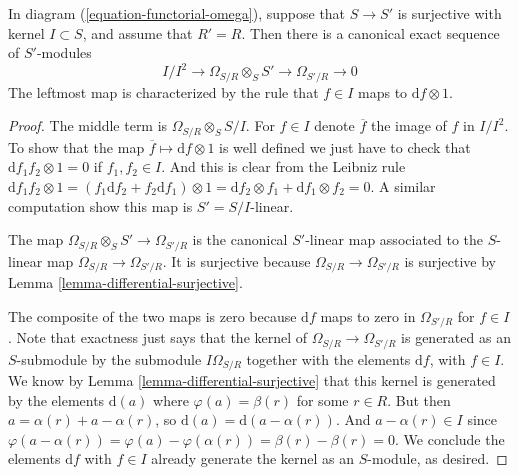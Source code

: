 \begin{lemma}
\label{lemma-differential-seq}
In diagram (\ref{equation-functorial-omega}),
suppose that $S \to S'$ is surjective with kernel $I \subset S$,
and assume that $R' = R$.
Then there is a canonical exact sequence of $S'$-modules
$$
I/I^2
\longrightarrow
\Omega_{S/R} \otimes_S S'
\longrightarrow
\Omega_{S'/R}
\longrightarrow
0
$$
The leftmost map is characterized by the rule that
$f \in I$ maps to $\text{d}f \otimes 1$.
\end{lemma}

\begin{proof}
The middle term is $\Omega_{S/R} \otimes_S S/I$.
For $f \in I$ denote $\overline{f}$ the image of $f$ in $I/I^2$.
To show that the map $\overline{f} \mapsto \text{d}f \otimes 1$
is well defined we just have to check that
$\text{d} f_1f_2 \otimes 1 = 0$ if $f_1, f_2 \in I$.
And this is clear from the Leibniz rule
$\text{d} f_1f_2 \otimes 1 = (f_1 \text{d}f_2 + f_2 \text{d} f_1 )\otimes 1 =
\text{d}f_2 \otimes f_1 + \text{d}f_1 \otimes f_2 = 0$.
A similar computation show this map is $S' = S/I$-linear.

\medskip\noindent
The map $\Omega_{S/R} \otimes_S S' \to \Omega_{S'/R}$
is the canonical $S'$-linear map associated to the
$S$-linear map $\Omega_{S/R} \to \Omega_{S'/R}$.
It is surjective because $\Omega_{S/R} \to \Omega_{S'/R}$
is surjective by Lemma \ref{lemma-differential-surjective}.

\medskip\noindent
The composite of the two maps is zero because
$\text{d}f$ maps to zero in $\Omega_{S'/R}$
for $f \in I$. Note that exactness just says that
the kernel of $\Omega_{S/R} \to \Omega_{S'/R}$
is generated as an $S$-submodule by the submodule $I\Omega_{S/R}$ together
with the elements $\text{d}f$, with $f \in I$. We know by
Lemma \ref{lemma-differential-surjective}
that this kernel is generated by the elements $\text{d}(a)$
where $\varphi(a) = \beta(r)$ for some $r \in R$.
But then $a = \alpha(r) + a - \alpha(r)$, so
$\text{d}(a) = \text{d}(a - \alpha(r))$. And
$a - \alpha(r) \in I$ since $\varphi(a - \alpha(r)) =
\varphi(a) - \varphi(\alpha(r)) = \beta(r) - \beta(r) = 0$.
We conclude the elements $\text{d}f$ with $f \in I$ already
generate the kernel as an $S$-module, as desired.
\end{proof}
